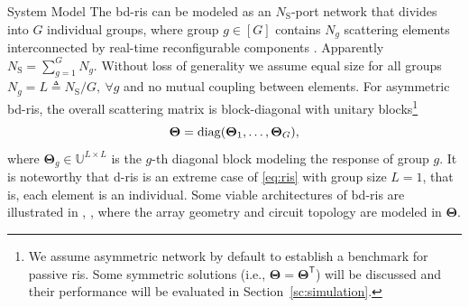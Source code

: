 \documentclass[journal]{IEEEtran}
\begin{document}
\begin{section}{System Model}
		The \gls{bd}-\gls{ris} can be modeled as an $N_\mathrm{S}$-port network \cite{Ivrlac2010} that divides into $G$ individual groups, where group $g \in [G]$ contains $N_g$ scattering elements interconnected by real-time reconfigurable components \cite{Shen2020a}.
		Apparently $N_\mathrm{S} = \sum_{g=1}^G N_g$.
		Without loss of generality we assume equal size for all groups $N_g = L \triangleq N_\mathrm{S} / G, \ \forall g$ and no mutual coupling between elements.
		For asymmetric \gls{bd}-\gls{ris}, the overall scattering matrix is block-diagonal with unitary blocks\footnote{We assume asymmetric network by default to establish a benchmark for passive \gls{ris}. Some symmetric solutions (i.e., $\mathbf{\Theta} = \mathbf{\Theta}^\mathsf{T}$) will be discussed and their performance will be evaluated in Section~\ref{sc:simulation}.}
		\begin{equation}
			\label{eq:ris}
			\mathbf{\Theta} = \operatorname{diag}(\mathbf{\Theta}_1,\ldots,\mathbf{\Theta}_G),
		\end{equation}
		where $\mathbf{\Theta}_g \in \mathbb{U}^{L \times L}$ is the $g$-th diagonal block modeling the response of group $g$.
		It is noteworthy that \gls{d}-\gls{ris} is an extreme case of \eqref{eq:ris} with group size $L=1$, that is, each element is an individual.
		Some viable architectures of \gls{bd}-\gls{ris} are illustrated in \cite[Fig. 3]{Shen2020a}, \cite[Fig. 5]{Li2023c}, \cite[Fig. 2]{Nerini2024} where the array geometry and circuit topology are modeled in $\mathbf{\Theta}$.


\end{section}
\end{document}
